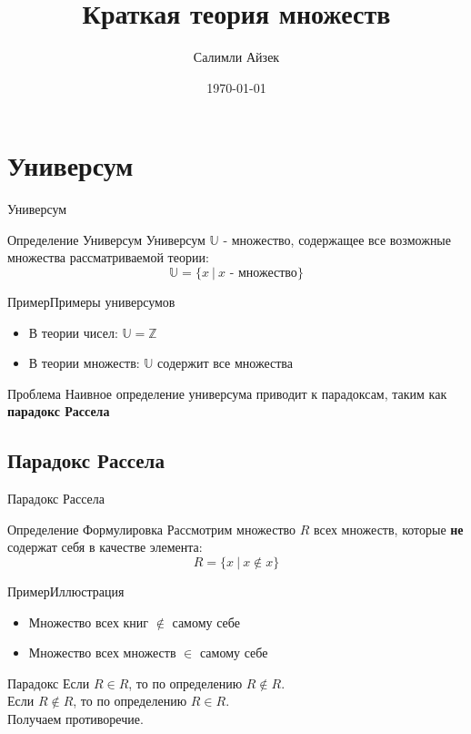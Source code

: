 \documentclass{beamer}
\title[МОП]{Краткая теория множеств}
\author{Салимли Айзек}
\institute{MathLang}
\date{\today}
\newenvironment{rusdefinition}[1][Определение]{
    \begin{block}{#1}
}{\end{block}}
\newenvironment{rexample}[1][Пример]{\begin{exampleblock}{#1}}{\end{exampleblock}}
\begin{document}
\begin{frame}
    \titlepage
\end{frame}


\section{Универсум}
\begin{frame}{Универсум}
\begin{rusdefinition}{Универсум}
Универсум $\mathbb{U}$ - множество, содержащее все возможные множества рассматриваемой теории:
\[ \mathbb{U} = \{x\ |\ x \text{ - множество}\} \]
\end{rusdefinition}

\begin{rexample}{Примеры универсумов}
\begin{itemize}
\item В теории чисел: $\mathbb{U} = \mathbb{Z}$
\item В теории множеств: $\mathbb{U}$ содержит все множества
\end{itemize}
\end{rexample}

\begin{alertblock}{Проблема}
Наивное определение универсума приводит к парадоксам, таким как \textbf{парадокс Рассела}
\end{alertblock}
\end{frame}

\subsection{Парадокс Рассела}
\begin{frame}{Парадокс Рассела}
\begin{rusdefinition}{Формулировка}
Рассмотрим множество $R$ всех множеств, которые \textbf{не} содержат себя в качестве элемента:
\[ R = \{x\ |\ x \notin x\} \]
\end{rusdefinition}

\begin{rexample}{Иллюстрация}
\begin{itemize}
\item Множество всех книг $\notin$ самому себе
\item Множество всех множеств $\in$ самому себе
\end{itemize}
\end{rexample}

\begin{block}{Парадокс}
Если $R \in R$, то по определению $R \notin R$.\\
Если $R \notin R$, то по определению $R \in R$.\\
Получаем противоречие.
\end{block}
\end{frame}
\end{document}
